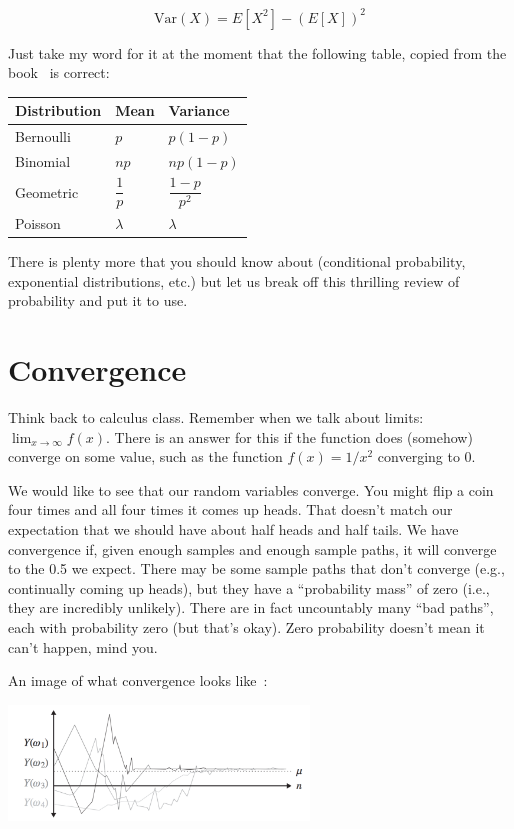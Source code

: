 \documentclass[a4paper]{report}
\begin{document}
\[
	\mathrm{Var}(X) = E[X^{2}] - (E[X])^{2}
\]

Just take my word for it at the moment that the following table, copied from the book~\cite{pmd} is correct:

\begin{center}
\begin{tabular}{l|l|l}
	\textbf{Distribution} & \textbf{Mean} & \textbf{Variance}\\ \hline
	Bernoulli & $p$ & $p(1-p)$\\ \hline
	Binomial & $np$ & $np(1-p)$\\ \hline
	Geometric & $\dfrac{1}{p}$ & $\dfrac{1-p}{p^{2}}$ \\ \hline
	Poisson & $\lambda$ & $\lambda$
\end{tabular}
\end{center}

There is plenty more that you should know about (conditional probability, exponential distributions, etc.) but let us break off this thrilling review of probability and put it to use.

\section*{Convergence}

Think back to calculus class. Remember when we talk about limits: $\lim_{x\to\infty} f(x)$. There is an answer for this if the function does (somehow) converge on some value, such as the function $f(x) = 1/x^{2}$ converging to 0.

We would like to see that our random variables converge. You might flip a coin four times and all four times it comes up heads. That doesn't match our expectation that we should have about half heads and half tails. We have convergence if, given enough samples and enough sample paths, it will converge to the 0.5 we expect. There may be some sample paths that don't converge (e.g., continually coming up heads), but they have a ``probability mass'' of zero (i.e., they are incredibly unlikely).  There are in fact uncountably many ``bad paths'', each with probability zero (but that's okay). Zero probability doesn't mean it can't happen, mind you.

An image of what convergence looks like~\cite{pmd}:

\begin{center}
	\includegraphics[width=0.6\textwidth]{images/convergence.png}
\end{center}
\end{document}
